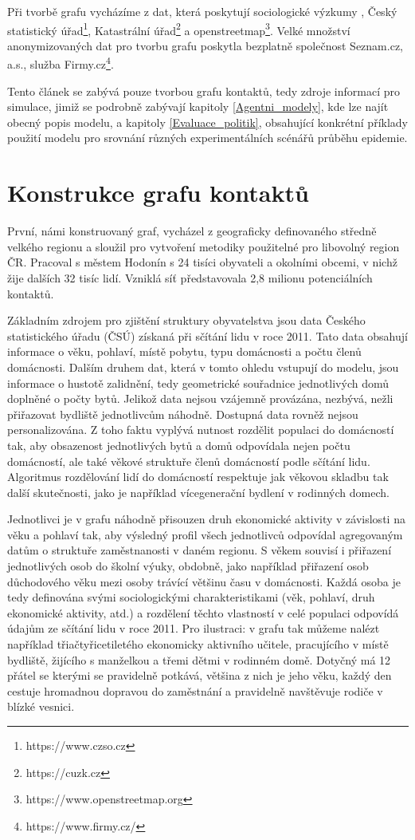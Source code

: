 Při tvorbě grafu vycházíme z dat, která poskytují sociologické výzkumy \cite{paqcovid, zaj:mediancovid, zaj:medianlife}, Český statistický úřad\footnote{https://www.czso.cz}, Katastrální úřad\footnote{https://cuzk.cz} a openstreetmap\footnote{https://www.openstreetmap.org}. Velké množství anonymizovaných dat pro tvorbu grafu poskytla bezplatně společnost Seznam.cz, a.s., služba Firmy.cz\footnote{https://www.firmy.cz/}.

Tento článek se zabývá pouze tvorbou grafu kontaktů, tedy zdroje informací pro simulace, jimiž se podrobně zabývají kapitoly \ref{Agentni_modely}, kde lze najít obecný popis modelu, a kapitoly \ref{Evaluace_politik}, obsahující konkrétní příklady použití modelu pro srovnání různých experimentálních scénářů průběhu epidemie.


\section*{Konstrukce grafu kontaktů}

První, námi konstruovaný graf, vycházel z geograficky definovaného středně velkého regionu a sloužil pro vytvoření metodiky použitelné pro libovolný region ČR.  Pracoval s městem Hodonín s 24 tisíci obyvateli a okolními obcemi, v nichž žije dalších 32 tisíc lidí. Vzniklá síť představovala 2,8 milionu potenciálních kontaktů. 

Základním zdrojem pro zjištění struktury obyvatelstva jsou data Českého statistického úřadu (ČSÚ) získaná při sčítání lidu v roce 2011. Tato data obsahují informace o věku, pohlaví, místě pobytu, typu domácnosti a počtu členů domácnosti. Dalším druhem dat, která v tomto ohledu vstupují do modelu, jsou informace o hustotě zalidnění, tedy geometrické souřadnice jednotlivých domů doplněné o počty bytů. Jelikož data nejsou vzájemně provázána, nezbývá, nežli přiřazovat bydliště jednotlivcům náhodně. Dostupná data rovněž nejsou personalizována. Z toho faktu vyplývá nutnost rozdělit populaci do domácností tak, aby obsazenost jednotlivých bytů a domů odpovídala nejen počtu domácností, ale také věkové struktuře členů domácností podle sčítání lidu. Algoritmus rozdělování lidí do domácností respektuje jak věkovou skladbu tak další skutečnosti, jako je například vícegenerační bydlení v rodinných domech.

Jednotlivci je v grafu náhodně přisouzen druh ekonomické aktivity v závislosti na věku a pohlaví tak, aby výsledný profil všech jednotlivců odpovídal agregovaným datům o struktuře zaměstnanosti v daném regionu. S věkem souvisí i přiřazení jednotlivých osob do školní výuky, obdobně, jako například přiřazení osob důchodového věku mezi osoby trávící většinu času v domácnosti. Každá osoba je tedy definována svými sociologickými charakteristikami (věk, pohlaví, druh ekonomické aktivity, atd.)  a rozdělení těchto vlastností v celé populaci odpovídá údajům ze sčítání lidu v roce 2011. Pro ilustraci: v grafu tak můžeme nalézt například třiačtyřicetiletého ekonomicky aktivního učitele, pracujícího v místě bydliště, žijícího s manželkou a třemi dětmi v rodinném domě. Dotyčný má 12 přátel se kterými se pravidelně potkává, většina z nich je jeho věku, každý den cestuje hromadnou dopravou do zaměstnání a pravidelně navštěvuje rodiče v blízké vesnici.

